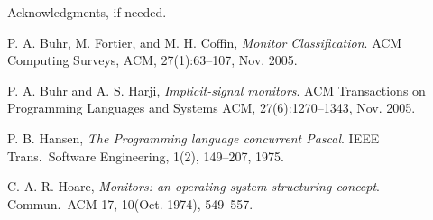 \documentclass[preprint]{sigplanconf}
\begin{document}
\acks

Acknowledgments, if needed.





\begin{thebibliography}{}
\softraggedright

  P. A. Buhr, M. Fortier, and M. H. Coffin, \emph{Monitor Classification}. ACM 
  Computing Surveys, ACM, 27(1):63--107, 
  Nov. 2005.
  
  P. A. Buhr and A. S. Harji, \emph{Implicit-signal monitors}. ACM 
  Transactions on Programming Languages and Systems ACM, 27(6):1270--1343, 
  Nov. 2005.

  P. B. Hansen, \emph{The Programming language concurrent Pascal}. IEEE
  Trans.~Software Engineering, 1(2), 149--207, 1975.

  C. A. R. Hoare, \emph{Monitors: an operating system structuring concept}. 
  Commun.~ACM 17, 10(Oct. 1974), 549--557.



\end{thebibliography}
\end{document}
